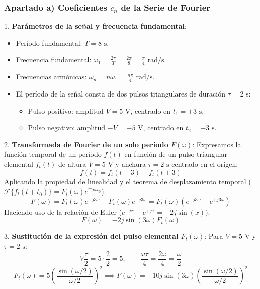 \begin{resolucion}
\subsubsection*{Apartado a) Coeficientes $c_n$ de la Serie de Fourier}

1. \textbf{Parámetros de la señal y frecuencia fundamental}:
   \begin{itemize}[leftmargin=*]
       \item Período fundamental: $T = 8\text{ s}$.
       \item Frecuencia fundamental: $\omega_1 = \frac{2\pi}{T} = \frac{2\pi}{8} = \frac{\pi}{4}\text{ rad/s}$.
       \item Frecuencias armónicas: $\omega_n = n \omega_1 = \frac{n\pi}{4}\text{ rad/s}$.
       \item El período de la señal consta de dos pulsos triangulares de duración $\tau = 2\text{ s}$:
         \begin{itemize}
             \item Pulso positivo: amplitud $V = 5\text{ V}$, centrado en $t_1 = +3\text{ s}$.
             \item Pulso negativo: amplitud $-V = -5\text{ V}$, centrado en $t_2 = -3\text{ s}$.
         \end{itemize}
   \end{itemize}

2. \textbf{Transformada de Fourier de un solo período $F(\omega)$}:
   Expresamos la función temporal de un período $f(t)$ en función de un pulso triangular elemental $f_t(t)$ de altura $V=5\text{ V}$ y anchura $\tau=2\text{ s}$ centrado en el origen:
   \[
   f(t) = f_t(t - 3) - f_t(t + 3)
   \]
   Aplicando la propiedad de linealidad y el teorema de desplazamiento temporal ($\mathcal{F}\{f_t(t \mp t_0)\} = F_t(\omega) e^{\mp j\omega t_0}$):
   \[
   F(\omega) = F_t(\omega) e^{-j 3 \omega} - F_t(\omega) e^{+j 3 \omega} = F_t(\omega) \left( e^{-j 3 \omega} - e^{+j 3 \omega} \right)
   \]
   Haciendo uso de la relación de Euler ($e^{-jx} - e^{+jx} = -2j \sin(x)$):
   \[
   F(\omega) = -2j \sin(3\omega) F_t(\omega)
   \]

3. \textbf{Sustitución de la expresión del pulso elemental $F_t(\omega)$}:
   Para $V = 5\text{ V}$ y $\tau = 2\text{ s}$:
   \[
   V \frac{\tau}{2} = 5 \cdot \frac{2}{2} = 5, \qquad \frac{\omega\tau}{4} = \frac{2\omega}{4} = \frac{\omega}{2}
   \]
   \[
   F_t(\omega) = 5 \left( \frac{\sin(\omega/2)}{\omega/2} \right)^2 \implies F(\omega) = -10j \sin(3\omega) \left( \frac{\sin(\omega/2)}{\omega/2} \right)^2
   \]


\end{resolucion}
